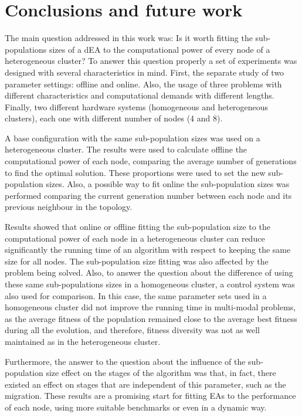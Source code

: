 \documentclass[final,1p,times]{elsarticle}
\begin{document}
\section{Conclusions and future work}



The main question addressed in this work was: Is it worth fitting the 
sub-populations sizes of a dEA to the computational power of every node 
of a heterogeneous cluster? To answer this question properly a set of 
experiments was designed with several characteristics in mind. 
First, the separate study of two parameter settings: offline and 
online. Also, the usage of three problems with different characteristics and 
computational demands with different lengths. Finally, two different hardware 
systems (homogeneous and heterogeneous clusters),  each one with different number
 of nodes (4 and 8).

A base configuration with the same sub-population sizes was used on a heterogeneous cluster. The results were used to calculate offline the computational power of each node, comparing the average number of generations to find the optimal solution. These proportions were used to set the new sub-population sizes. Also, a possible way to fit online the sub-population sizes was performed comparing the current generation number between each node and its previous neighbour in the topology. 

Results showed that online or offline fitting the sub-population size to the computational power of each node in a heterogeneous cluster
can reduce significantly the running time of an algorithm with respect
to keeping the same size for all nodes. The sub-population size fitting was also affected by the problem being solved. Also, to answer the question about the difference of using these same sub-populations sizes in a homogeneous cluster, a control system was also used for comparison. In this case, the same parameter sets used in a homogeneous cluster did not improve the running time in multi-modal problems, as the average fitness of the population remained close to the average best fitness during all the evolution, and therefore, fitness diversity was not as well maintained as in the heterogeneous cluster.



Furthermore, the answer to the question about the influence of the sub-population size effect on the stages
of the algorithm was that, in fact, there existed an effect on stages that are independent of this parameter, such as
the migration.  These results are a promising start for fitting EAs to the performance of each  node, using more suitable benchmarks or even in a dynamic way. 
\end{document}
